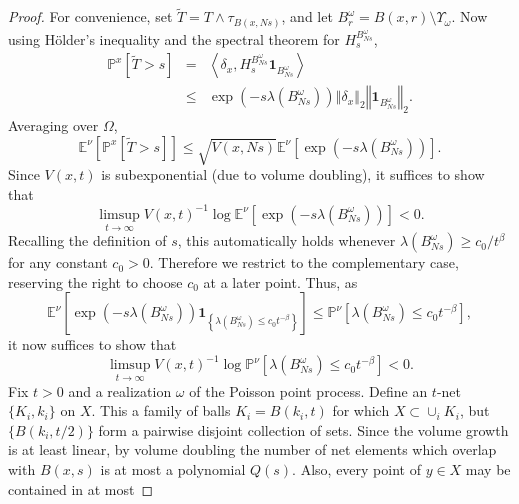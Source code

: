 \documentclass[letterpaper,oneside,english]{amsart}
\begin{document}
\begin{proof}
For convenience, set $\tilde{T}=T\wedge \tau_{B\left(x,Ns\right)}$, and let $B_{r}^{\omega}=B(x,r)\setminus {\Upsilon_{\omega}}$. Now using H\"{o}lder's inequality and the spectral theorem for $H^{B_{Ns}^{\omega}}_{s}$, 
\begin{eqnarray*}
\mathbb{P}^{x}\left[\tilde{T}>s\right] 
 & = & \left\langle \delta_{x},H^{B_{Ns}^{\omega}}_{s}\mathbf{1}_{B_{Ns}^{\omega}}\right\rangle \\
 & \le & \exp\left(-s\lambda\left(B_{Ns}^{\omega}\right)\right)\left\Vert \delta_{x}\right\Vert _{2}\left\Vert \mathbf{1}_{B_{Ns}^{\omega}}\right\Vert _{2}.
 \end{eqnarray*}
Averaging over $\Omega$, 
 \begin{equation}
 \mathbb{E}^{\nu}\left[\mathbb{P}^x\left[\tilde{T}>s\right]\right] \le \sqrt{V(x,Ns)}\mathbb{E}^{\nu}\left[\exp\left(-s\lambda\left(B_{Ns}^{\omega}\right)\right)\right].
 \end{equation}
Since $V(x,t)$  is subexponential (due to volume doubling), it suffices to show that
\begin{equation}
\limsup_{t\rightarrow\infty}V(x,t)^{-1}\log\mathbb{E}^{\nu}\left[\exp\left(-s\lambda\left(B_{Ns}^{\omega}\right)\right)\right]  <  0.
\end{equation} 
Recalling the definition of $s$, this automatically holds whenever $\lambda\left(B_{Ns}^{\omega}\right)\ge c_0/t^{\beta}$ for any constant $c_0>0$.  Therefore we restrict to the complementary case, reserving the right to choose $c_0$ at a later point.  Thus, as
\begin{equation}
\mathbb{E}^{\nu}\left[\exp\left(-s\lambda\left(B_{Ns}^{\omega}\right)\right) \mathbf{1}_{\left\{ \lambda\left(B_{Ns}^{\omega}\right) \le c_{0}t^{-\beta}\right\} }\right]  \le  \mathbb{P}^{\nu}\left[\lambda\left(B_{Ns}^{\omega}\right)\leq c_{0}t^{-\beta}\right],
\end{equation}
it now suffices to show that 
\begin{equation}
\limsup_{t\rightarrow\infty}V(x,t)^{-1}\log\mathbb{P}^{\nu}\left[\lambda\left(B_{Ns}^{\omega}\right)\leq c_{0}t^{-\beta}\right]  <  0.
\end{equation}
Fix $t>0$ and a realization $\omega$ of the Poisson point process.
Define an $t$-net $\{K_i,k_i \}$ on $X$.  This a family of balls $K_i=B(k_i,t)$ for which $X\subset \cup_i K_i$, but $\{B(k_i,t/2)\}$ form a pairwise disjoint collection of sets.  Since the volume growth is at least linear, by volume doubling the number of net elements which overlap with $B(x,s)$ is at most a polynomial $Q(s)$.  Also, every point of $y \in X$ may be contained in at most 

\end{proof}
\end{document}
